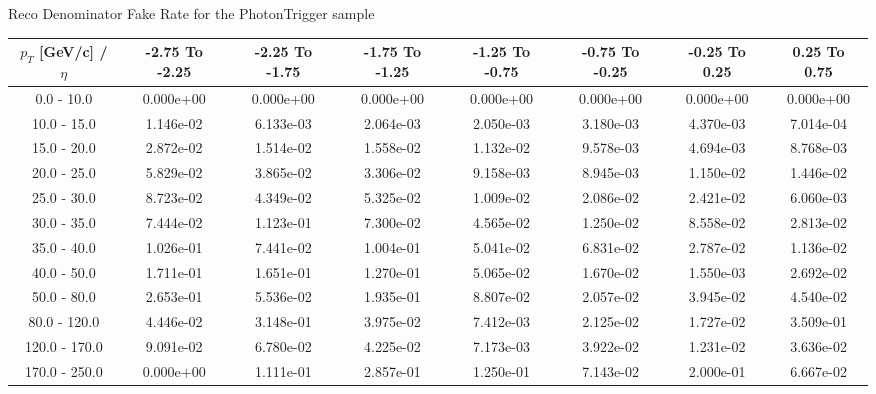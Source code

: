 \large 
Reco Denominator Fake Rate for the PhotonTrigger sample
\footnotesize 
\begin{tabular*}{\textwidth}{|c|c|c|c|c|c|c|c|}\hline 
$p_T$ [GeV/c] / $\eta$  & -2.75 To -2.25 & -2.25 To -1.75 & -1.75 To -1.25 & -1.25 To -0.75 & -0.75 To -0.25 & -0.25 To 0.25 & 0.25 To 0.75 \\ 
 \hline 
0.0 - 10.0 & 0.000e+00 & 0.000e+00 & 0.000e+00 & 0.000e+00 & 0.000e+00 & 0.000e+00 & 0.000e+00 \\ 
10.0 - 15.0 & 1.146e-02 & 6.133e-03 & 2.064e-03 & 2.050e-03 & 3.180e-03 & 4.370e-03 & 7.014e-04 \\ 
15.0 - 20.0 & 2.872e-02 & 1.514e-02 & 1.558e-02 & 1.132e-02 & 9.578e-03 & 4.694e-03 & 8.768e-03 \\ 
20.0 - 25.0 & 5.829e-02 & 3.865e-02 & 3.306e-02 & 9.158e-03 & 8.945e-03 & 1.150e-02 & 1.446e-02 \\ 
25.0 - 30.0 & 8.723e-02 & 4.349e-02 & 5.325e-02 & 1.009e-02 & 2.086e-02 & 2.421e-02 & 6.060e-03 \\ 
30.0 - 35.0 & 7.444e-02 & 1.123e-01 & 7.300e-02 & 4.565e-02 & 1.250e-02 & 8.558e-02 & 2.813e-02 \\ 
35.0 - 40.0 & 1.026e-01 & 7.441e-02 & 1.004e-01 & 5.041e-02 & 6.831e-02 & 2.787e-02 & 1.136e-02 \\ 
40.0 - 50.0 & 1.711e-01 & 1.651e-01 & 1.270e-01 & 5.065e-02 & 1.670e-02 & 1.550e-03 & 2.692e-02 \\ 
50.0 - 80.0 & 2.653e-01 & 5.536e-02 & 1.935e-01 & 8.807e-02 & 2.057e-02 & 3.945e-02 & 4.540e-02 \\ 
80.0 - 120.0 & 4.446e-02 & 3.148e-01 & 3.975e-02 & 7.412e-03 & 2.125e-02 & 1.727e-02 & 3.509e-01 \\ 
120.0 - 170.0 & 9.091e-02 & 6.780e-02 & 4.225e-02 & 7.173e-03 & 3.922e-02 & 1.231e-02 & 3.636e-02 \\ 
170.0 - 250.0 & 0.000e+00 & 1.111e-01 & 2.857e-01 & 1.250e-01 & 7.143e-02 & 2.000e-01 & 6.667e-02 \\ 
 \hline 
\end{tabular*} 
